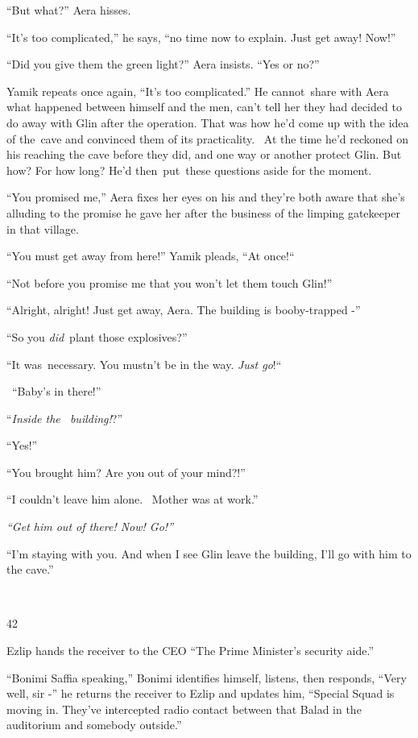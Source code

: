 \documentclass[twoside,11pt]{book}
\begin{document}
``But what?'' Aera hisses. 

``It's too complicated,'' he says, ``no time now to explain. Just get away!
Now!'' 

``Did you give them the green light?'' Aera insists. ``Yes or no?'' 

Yamik repeats once again, ``It's too complicated.'' He
cannot{\ }share with Aera what happened between himself and the men, can't tell
her they had decided to do away with Glin after the operation. That was how he'd come up with the idea of the\ cave and
convinced them of its practicality. \ At the time he'd reckoned on his reaching the cave before they did, and one way
or another protect Glin. But how? For how long? He'd then~put~these questions aside for the moment. 

``You promised me,'' Aera fixes her eyes on his and they're both aware that she's alluding to
the promise he gave her after the business of the limping gatekeeper in that village.

``You must get away from here!'' Yamik pleads, ``At
once!``~~~~~~~~~~~ 

``Not before you promise me that you won't let them touch Glin!'' 

``Alright, alright! Just get away, Aera{. T}he building is
booby-trapped -'' 

``So you \textit{did}{\ }plant those explosives?'' 

``{I}t was{\ }necessary.
You mustn't be in the way. \textit{Just go}!``\ 

~``Baby's in there!'' 

``\textit{Inside the~ building!}?'' 

``Yes!'' 

``You brought him? Are you out of your mind?!'' 

``I couldn't leave him alone{.\ } Mother was at
work.'' 

\textit{``Get him out of there! Now! Go!'' }

``I'm staying with you. And when I see Glin leave the building, I'll go with him to the
cave.'' 

~

42\ \ 

Ezlip hands the receiver to the CEO ``The Prime Minister's security aide.'' 

``Bonimi Saffia speaking,'' Bonimi identifies himself, listens, then responds,
``Very well, sir -'' he returns the receiver to Ezlip and updates him, ``Special
Squad is moving in. They've intercepted radio contact between that Balad in the auditorium and somebody
outside.'' 
\end{document}
